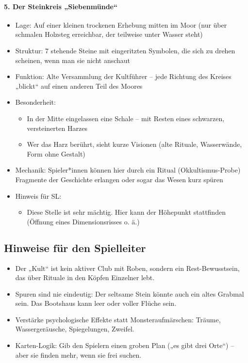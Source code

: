 \paragraph{5. Der Steinkreis „Siebenmünde“}
\begin{itemize}
\item Lage: Auf einer kleinen trockenen Erhebung mitten im Moor (nur über schmalen Holzsteg erreichbar, der teilweise unter Wasser steht)
\item Struktur: 7 stehende Steine mit eingeritzten Symbolen, die sich zu drehen scheinen, wenn man sie nicht anschaut
\item Funktion: Alte Versammlung der Kultführer – jede Richtung des Kreises „blickt“ auf einen anderen Teil des Moores
\item Besonderheit:  
	\begin{itemize}
    \item In der Mitte eingelassen eine Schale – mit Resten eines schwarzen, versteinerten Harzes
    \item Wer das Harz berührt, sieht kurze Visionen (alte Rituale, Wasserwände, Form ohne Gestalt)
	\end{itemize}
\item Mechanik: Spieler*innen können hier durch ein Ritual (Okkultismus-Probe) Fragmente der Geschichte erlangen oder sogar das Wesen kurz spüren
\item Hinweis für SL:
	\begin{itemize}
    \item Diese Stelle ist sehr mächtig. Hier kann der Höhepunkt stattfinden (Öffnung eines Dimensionsrisses o. ä.)
	\end{itemize}
\end{itemize}

\subsection*{Hinweise für den Spielleiter}
\begin{itemize}
\item Der „Kult“ ist kein aktiver Club mit Roben, sondern ein Rest-Bewusstsein, das über Rituale in den Köpfen Einzelner lebt.
\item Spuren sind nie eindeutig: Der seltsame Stein könnte auch ein altes Grabmal sein. Das Bootshaus kann leer oder voller Flüche sein.
\item Verstärke psychologische Effekte statt Monsteraufmärschen: Träume, Wassergeräusche, Spiegelungen, Zweifel.
\item Karten-Logik: Gib den Spielern einen groben Plan („es gibt drei Orte“) – aber sie finden mehr, wenn sie frei suchen.
\end{itemize}